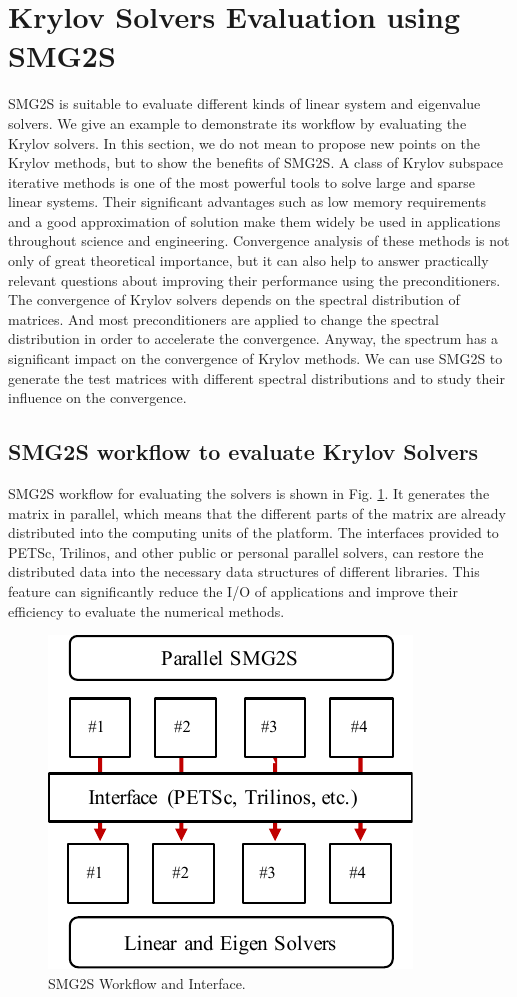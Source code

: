 \section{Krylov Solvers Evaluation using SMG2S}\label{application}

SMG2S is suitable to evaluate different kinds of linear system and eigenvalue solvers. We give an example to demonstrate its workflow by evaluating the Krylov solvers. In this section, we do not mean to propose new points on the Krylov methods, but to show the benefits of SMG2S. A class of Krylov subspace iterative methods is one of the most powerful tools to solve large and sparse linear systems. Their significant advantages such as low memory requirements and a good approximation of solution make them widely be used in applications throughout science and engineering. Convergence analysis of these methods is not only of great theoretical importance, but it can also help to answer practically relevant questions about improving their performance using the preconditioners. The convergence of Krylov solvers depends on the spectral distribution of matrices. And most preconditioners are applied to change the spectral distribution in order to accelerate the convergence. Anyway, the spectrum has a significant impact on the convergence of Krylov methods. We can use SMG2S to generate the test matrices with different spectral distributions and to study their influence on the convergence.

\subsection{SMG2S workflow to evaluate Krylov Solvers}

SMG2S workflow for evaluating the solvers is shown in Fig. \ref{fig:interface}. It generates the matrix in parallel, which means that the different parts of the matrix are already distributed into the computing units of the platform. The interfaces provided to PETSc, Trilinos, and other public or personal parallel solvers, can restore the distributed data into the necessary data structures of different libraries. This feature can significantly reduce the I/O of applications and improve their efficiency to evaluate the numerical methods.

\begin{figure}[t]
	\centering
	\includegraphics[width=0.64\linewidth]{fig/interface.pdf}
	\caption{SMG2S Workflow and Interface.}
	\label{fig:interface}
\end{figure}


